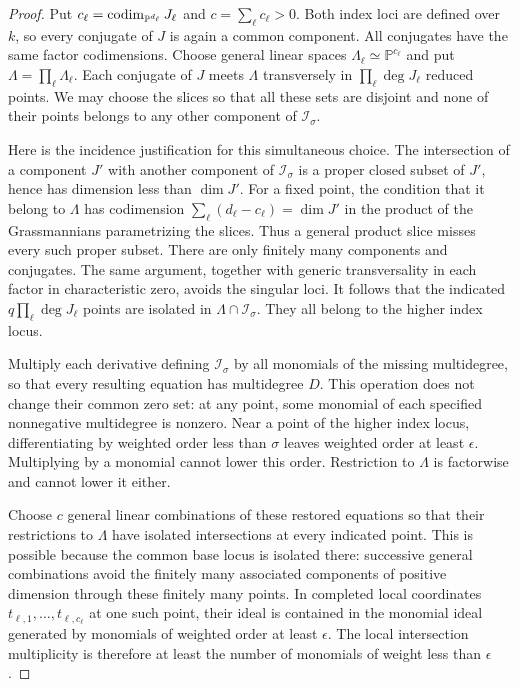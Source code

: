 \begin{proof}
Put $c_\ell=\operatorname{codim}_{\mathbb P^{d_\ell}}J_\ell$ and
$c=\sum_\ell c_\ell>0$.  Both index loci are defined over $k$, so
every conjugate of $J$ is again a common component.  All conjugates
have the same factor codimensions.  Choose general linear spaces
$\Lambda_\ell\simeq\mathbb P^{c_\ell}$ and put
$\Lambda=\prod_\ell\Lambda_\ell$.  Each conjugate of $J$ meets
$\Lambda$ transversely in $\prod_\ell\deg J_\ell$ reduced points.
We may choose the slices so that all these sets are disjoint and
none of their points belongs to any other component of
$\mathcal I_\sigma$.

Here is the incidence justification for this simultaneous choice.
The intersection of a component $J'$ with another component of
$\mathcal I_\sigma$ is a proper closed subset of $J'$, hence has
dimension less than $\dim J'$.  For a fixed point, the condition
that it belong to $\Lambda$ has codimension
$\sum_\ell(d_\ell-c_\ell)=\dim J'$ in the product of the
Grassmannians parametrizing the slices.  Thus a general product
slice misses every such proper subset.  There are only finitely
many components and conjugates.  The same argument, together with
generic transversality in each factor in characteristic zero,
avoids the singular loci.  It follows that the indicated
$q\prod_\ell\deg J_\ell$ points are isolated in
$\Lambda\cap\mathcal I_\sigma$.  They all belong to the higher
index locus.

Multiply each derivative defining $\mathcal I_\sigma$ by all
monomials of the missing multidegree, so that every resulting
equation has multidegree $D$.  This operation does not change their
common zero set: at any point, some monomial of each specified
nonnegative multidegree is nonzero.  Near a point of the higher
index locus, differentiating by weighted order less than $\sigma$
leaves weighted order at least $\epsilon$.  Multiplying by a
monomial cannot lower this order.  Restriction to $\Lambda$ is
factorwise and cannot lower it either.

Choose $c$ general linear combinations of these restored equations
so that their restrictions to $\Lambda$ have isolated intersections
at every indicated point.  This is possible because the common
base locus is isolated there: successive general combinations avoid
the finitely many associated components of positive dimension
through these finitely many points.  In completed local coordinates
$t_{\ell,1},\ldots,t_{\ell,c_\ell}$ at one such point, their
ideal is contained in the monomial ideal generated by monomials of
weighted order at least $\epsilon$.  The local intersection
multiplicity is therefore at least the number of monomials of
weight less than $\epsilon$.


\end{proof}
